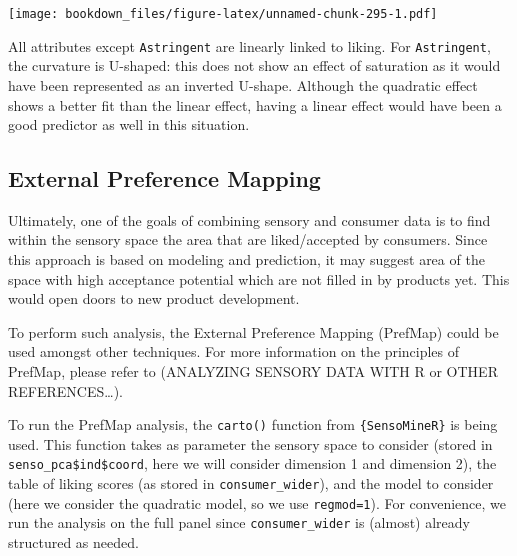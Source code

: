 \documentclass[
]{krantz}
\makeatletter
\newenvironment{Shaded}{\begin{snugshade}}{\end{snugshade}}
\newcommand{\AttributeTok}[1]{\textcolor[rgb]{0.61,0.61,0.61}{#1}}
\newcommand{\ConstantTok}[1]{\textcolor[rgb]{0,0,0}{#1}}
\newcommand{\ControlFlowTok}[1]{\textcolor[rgb]{0.27,0.27,0.27}{\textbf{#1}}}
\newcommand{\FunctionTok}[1]{\textcolor[rgb]{0,0,0}{#1}}
\newcommand{\NormalTok}[1]{#1}
\newcommand{\OtherTok}[1]{\textcolor[rgb]{0.37,0.37,0.37}{#1}}
\newcommand{\SpecialCharTok}[1]{\textcolor[rgb]{0,0,0}{#1}}
\newenvironment{kframe}{%
\medskip{}
\setlength{\fboxsep}{.8em}
 \def\at@end@of@kframe{}%
 \ifinner\ifhmode%
  \def\at@end@of@kframe{\end{minipage}}%
  \begin{minipage}{\columnwidth}%
 \fi\fi%
 \def\FrameCommand##1{\hskip\@totalleftmargin \hskip-\fboxsep
 \colorbox{shadecolor}{##1}\hskip-\fboxsep
     \hskip-\linewidth \hskip-\@totalleftmargin \hskip\columnwidth}%
 \MakeFramed {\advance\hsize-\width
   \@totalleftmargin\z@ \linewidth\hsize
   \@setminipage}}%
 {\par\unskip\endMakeFramed%
 \at@end@of@kframe}
\renewenvironment{Shaded}{\begin{kframe}}{\end{kframe}}
\makeatother
\begin{document}
\begin{Shaded}
\end{Shaded}

\texttt{[image: bookdown\_files/figure-latex/unnamed-chunk-295-1.pdf]}

All attributes except \texttt{Astringent} are linearly linked to liking. For \texttt{Astringent}, the curvature is U-shaped: this does not show an effect of saturation as it would have been represented as an inverted U-shape. Although the quadratic effect shows a better fit than the linear effect, having a linear effect would have been a good predictor as well in this situation.

\hypertarget{prefmap}{%
\subsection{External Preference Mapping}\label{prefmap}}

Ultimately, one of the goals of combining sensory and consumer data is to find within the sensory space the area that are liked/accepted by consumers. Since this approach is based on modeling and prediction, it may suggest area of the space with high acceptance potential which are not filled in by products yet. This would open doors to new product development.

To perform such analysis, the External Preference Mapping (PrefMap) could be used amongst other techniques. For more information on the principles of PrefMap, please refer to (ANALYZING SENSORY DATA WITH R or OTHER REFERENCES\ldots).

To run the PrefMap analysis, the \texttt{carto()} function from \texttt{\{SensoMineR\}} is being used. This function takes as parameter the sensory space to consider (stored in \texttt{senso\_pca\$ind\$coord}, here we will consider dimension 1 and dimension 2), the table of liking scores (as stored in \texttt{consumer\_wider}), and the model to consider (here we consider the quadratic model, so we use \texttt{regmod=1}). For convenience, we run the analysis on the full panel since \texttt{consumer\_wider} is (almost) already structured as needed.
\end{document}
